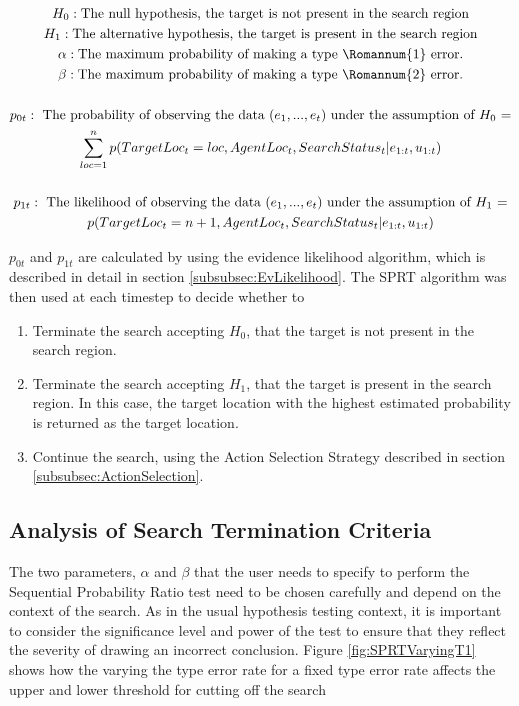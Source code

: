 \begin{gather}\label{eqn:SearchStatus}
H_0 : \text{The null hypothesis, the target is not present in the search region}\nonumber
\\ \nonumber
H_1 : \text{The alternative hypothesis, the target is present in the search region}\nonumber
\\ \nonumber
\alpha : \text{The maximum probability of making a type } \Romannum{1} \text{ error.} \nonumber
\\ \nonumber
\beta : \text{The maximum probability of making a type } \Romannum{2} \text{ error.}\nonumber
\\ \nonumber
\\ \nonumber
p_{0t} : \text{ The probability of observing the data $(e_1, ..., e_t)$ under the assumption of $H_0$ =} \nonumber
\\ \nonumber
\sum_{loc=1}^{n} p(TargetLoc_t = loc, AgentLoc_t, SearchStatus_t| e_{1:t}, u_{1:t})\nonumber
\\ \nonumber
\\ \nonumber
p_{1t} : \text{ The likelihood of observing the data $(e_1, ..., e_t)$ under the assumption of $H_1$ =} \nonumber
\\ \nonumber
p(TargetLoc_t = n+1, AgentLoc_t, SearchStatus_t | e_{1:t}, u_{1:t})\nonumber 
\end{gather}

$p_{0t}$ and $p_{1t}$ are calculated by using the evidence likelihood algorithm, which is described in detail in section \ref{subsubsec:EvLikelihood}. The SPRT algorithm was then used at each timestep to decide whether to 
\begin{enumerate}
    \item Terminate the search accepting $H_0$, that the target is not present in the search region.
    \item Terminate the search accepting $H_1$, that the target is present in the search region. In this case, the target location with the highest estimated probability is returned as the target location.
    \item Continue the search, using the Action Selection Strategy described in section \ref{subsubsec:ActionSelection}.
\end{enumerate}

\subsection{Analysis of Search Termination Criteria}
The two parameters, $\alpha$ and $\beta$ that the user needs to specify to perform the Sequential Probability Ratio test need to be chosen carefully and depend on the context of the search. As in the usual hypothesis testing context, it is important to consider the significance level and power of the test to ensure that they reflect the severity of drawing an incorrect conclusion. Figure \ref{fig:SPRTVaryingT1} shows how the varying the type  error rate for a fixed type  error rate affects the upper and lower threshold for cutting off the search 

